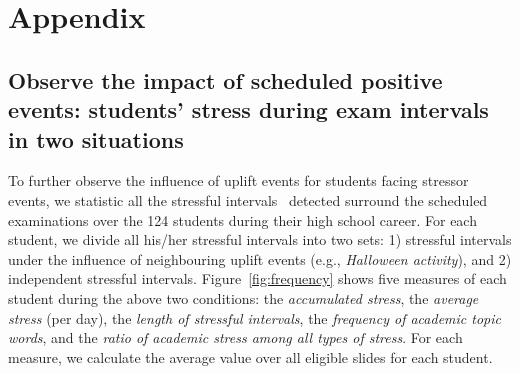 \section{Appendix}
\subsection{Observe the impact of scheduled positive events: students' stress during exam intervals in two situations}
To further observe the influence of uplift events for students facing stressor events,
we statistic all the stressful intervals~\cite{Li2017Analyzing} detected surround the scheduled examinations over the 124 students during their high school career.
For each student, we divide all his/her stressful intervals into two sets:
1) stressful intervals under the influence of neighbouring uplift events (e.g., \emph{Halloween activity}), and 2) independent stressful intervals.
Figure~\ref{fig:frequency} shows five measures of each student during the above two conditions:
the \emph{accumulated stress}, the \emph{average stress} (per day), the \emph{length of stressful intervals},
the \emph{frequency of academic topic words}, and the \emph{ratio of academic stress among all types of stress}.
For each measure, we calculate the average value over all eligible slides for each student.
